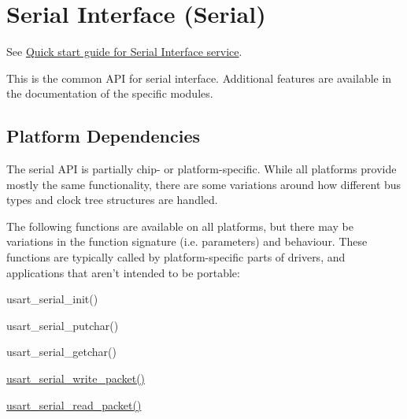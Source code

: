 \hypertarget{group__serial__group}{\section{Serial Interface (Serial)}
\label{group__serial__group}
}
See \hyperlink{serial_quickstart}{Quick start guide for Serial Interface service}.

This is the common A\-P\-I for serial interface. Additional features are available in the documentation of the specific modules.\hypertarget{group__serial__group_serial_group_platform}{}\subsection{Platform Dependencies}\label{group__serial__group_serial_group_platform}
The serial A\-P\-I is partially chip-\/ or platform-\/specific. While all platforms provide mostly the same functionality, there are some variations around how different bus types and clock tree structures are handled.

The following functions are available on all platforms, but there may be variations in the function signature (i.\-e. parameters) and behaviour. These functions are typically called by platform-\/specific parts of drivers, and applications that aren't intended to be portable\-:
\begin{DoxyItemize}
\item usart\-\_\-serial\-\_\-init()
\item usart\-\_\-serial\-\_\-putchar()
\item usart\-\_\-serial\-\_\-getchar()
\item \hyperlink{usart__serial_8h_af9393f1fa29d87970159fabd511b7de1}{usart\-\_\-serial\-\_\-write\-\_\-packet()}
\item \hyperlink{usart__serial_8h_a87b33461b725f80263a8628b6e852e9e}{usart\-\_\-serial\-\_\-read\-\_\-packet()} 
\end{DoxyItemize}